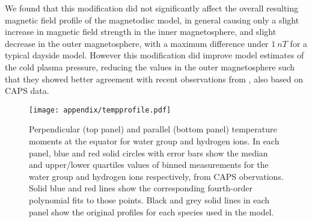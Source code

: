We found that this modification did not significantly affect the overall resulting magnetic field profile of the magnetodisc model, in general causing only a slight increase in magnetic field strength in the inner magnetosphere, and slight decrease in the outer magnetosphere, with a maximum difference under $\SI{1}{nT}$ for a typical dayside model. However this modification did improve model estimates of the cold plasma pressure, reducing the values in the outer magnetosphere such that they showed better agreement with recent observations from \citet{sergis2017}, also based on CAPS data.

\begin{figure}
\centering
\texttt{[image: appendix/tempprofile.pdf]}
\caption[Equatorial profiles of temperature moments from \citet{wilson2017}, with best fit polynomials.]{Perpendicular (top panel) and parallel (bottom panel) temperature moments at the equator for water group and hydrogen ions. In each panel, blue and red solid circles with error bars show the median and upper/lower quartiles values of binned measurements for the water group and hydrogen ions respectively, from \citet{wilson2017} CAPS obervations. Solid blue and red lines show the corresponding fourth-order polynomial fits to those points. Black and grey solid lines in each panel show the original profiles for each species used in the \citet{achilleos2010b} model.}
\label{appendix:fig:tempprofile}
\end{figure}



